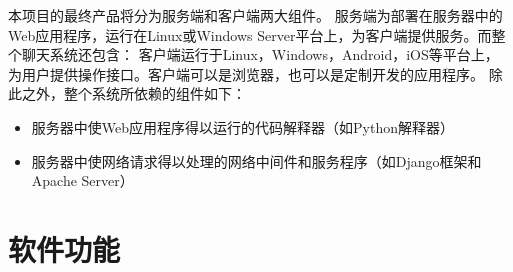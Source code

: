 




    

本项目的最终产品将分为服务端和客户端两大组件。
服务端为部署在服务器中的Web应用程序，运行在Linux或Windows Server平台上，为客户端提供服务。而整个聊天系统还包含：
客户端运行于Linux，Windows，Android，iOS等平台上，为用户提供操作接口。客户端可以是浏览器，也可以是定制开发的应用程序。
除此之外，整个系统所依赖的组件如下：
\begin{itemize}
	\item 服务器中使Web应用程序得以运行的代码解释器（如Python解释器）
	\item 服务器中使网络请求得以处理的网络中间件和服务程序（如Django框架和Apache Server）
\end{itemize}

\section{软件功能}

